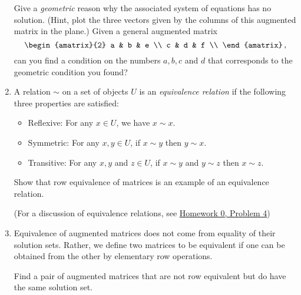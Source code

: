 \begin{enumerate}
Give a \emph{geometric} reason why the associated system of equations has no solution. (Hint, plot the three vectors
given by the columns of this augmented matrix in the plane.) Given a general augmented matrix \[
\begin{amatrix}{2} 
a & b & e  \\ 
c & d & f  \\ 
\end{amatrix}\, ,\] can you find a condition on the numbers $a,b,c$ and $d$ that corresponds to  the geometric condition you found?


\item \label{ge5} 
A relation $\sim$ on a set of objects $U$ is an \emph{equivalence relation} if the following three properties are satisfied:
\begin{itemize}
\item Reflexive:  For any $x\in U$, we have $x\sim x$.
\item Symmetric:  For any $x,y \in U$, if $x\sim y$ then $y\sim x$.
\item Transitive: For any $x,y$ and $z \in U$, if $x\sim y$ and $y\sim z$ then $x\sim z$.
\end{itemize}
Show that row equivalence of matrices is an example of an {equivalence relation}.  

(For a  discussion of equivalence relations, see \href{\webworkurl Homework0-Background/4/}{Homework 0, Problem 4})



\item Equivalence of augmented matrices does not come from equality of their solution sets. Rather, we define two matrices to be equivalent if one can be obtained from the other by elementary row operations. 

Find a pair of augmented matrices that are not row equivalent but do have the same solution set.

\end{enumerate}




